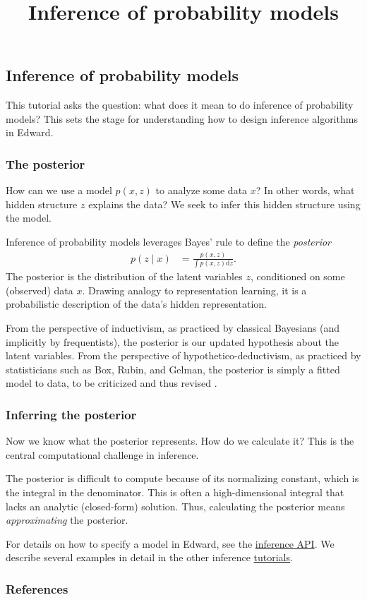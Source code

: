 \title{Inference of probability models}

\subsection{Inference of probability models}

This tutorial asks the question: what does it mean to do inference of
probability models? This sets the stage for understanding how to
design inference algorithms in Edward.

\subsubsection{The posterior}

How can we use a model $p(x,z)$ to analyze some data $x$? In other words,
what hidden structure $z$ explains the data? We seek to infer this
hidden structure using the model.

Inference of probability models leverages Bayes' rule to define the
\emph{posterior}
\begin{align*}
  p(z \mid x)
  &=
  \frac{p(x,z)}{\int p(x,z) \text{d}z}.
\end{align*}
The posterior is the distribution of the latent variables $z$, conditioned on
some (observed) data $x$.
Drawing analogy to representation learning, it is a probabilistic
description of the data's hidden representation.

From the perspective of inductivism, as practiced by classical
Bayesians (and implicitly by frequentists),
the posterior is our updated hypothesis about the latent variables.
From the perspective of hypothetico-deductivism, as practiced by
statisticians such as Box, Rubin, and Gelman, the posterior is simply
a fitted model to data, to be criticized and thus revised
\citep{box1982apology,gelman2013philosophy}.


\subsubsection{Inferring the posterior}

Now we know what the posterior represents. How do we calculate it? This is the
central computational challenge in inference.

The posterior is difficult to compute because of its normalizing
constant, which is the integral in the denominator.
This is often a high-dimensional integral that lacks an analytic (closed-form)
solution. Thus, calculating the posterior means \emph{approximating} the
posterior.

For details on how to specify a model in Edward, see the
\href{/api/inference}{inference API}. We describe several examples in
detail in the other inference \href{/tutorials/}{tutorials}.


\subsubsection{References}\label{references}

